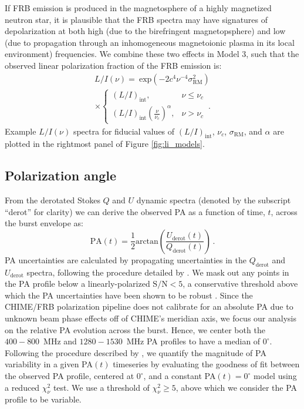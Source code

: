 \documentclass[twocolumn, linenumbers]{aastex701}
\begin{document}
If FRB emission is produced in the magnetosphere of a highly magnetized neutron star, it is plausible that the FRB spectra may have signatures of depolarization at both high (due to the birefringent magnetopsphere) and low (due to propagation through an inhomogeneous magnetoionic plasma in its local environment) frequencies. We combine these two effects in Model 3, such that the observed linear polarization fraction of the FRB emission is:
\begin{multline}
L/I (\nu) = ~\mathrm{exp} \left(-2 c^4 \nu^{-4} \sigma_\mathrm{RM}^2 \right)\\
\times
\begin{cases}
    (L/I)_\mathrm{int}, & \nu \leq \nu_c \\
    (L/I)_\mathrm{int} \left(\frac{\nu}{\nu_c}\right)^{\alpha}, & \nu > \nu_c 
\end{cases}
\,. \label{eq:model_3}
\end{multline}
Example $L/I (\nu)$ spectra for fiducial values of $(L/I)_\mathrm{int}$, $\nu_c$, $\sigma_\mathrm{RM}$, and $\alpha$ are plotted in the rightmost panel of Figure \ref{fig:li_models}.

\subsection{Polarization angle} \label{sec:models_pa}
From the derotated Stokes $Q$ and $U$ dynamic spectra (denoted by the subscript ``derot'' for clarity) we can derive the observed PA as a function of time, $t$, across the burst envelope as:
\begin{equation}
\mathrm{PA}(t) = \frac{1}{2} \mathrm{arctan} \left( \frac{U_\mathrm{derot}(t)}{Q_\mathrm{derot}(t)} \right)\,. \label{eq:pa}
\end{equation}
PA uncertainties are calculated by propagating uncertainties in the $Q_\mathrm{derot}$ and $U_\mathrm{derot}$ spectra, following the procedure detailed by \cite{2019ApJ...878...92V}. We mask out any points in the PA profile below a linearly-polarized $\mathrm{S/N} < 5$, a conservative threshold above which the PA uncertainties have been shown to be robust \citep[see Appendix B by][]{2024ApJ...968...50P}. Since the CHIME/FRB polarization pipeline does not calibrate for an absolute PA due to unknown beam phase effects off of CHIME's meridian axis, we focus our analysis on the relative PA evolution across the burst. Hence, we center both the $400-800$~MHz and $1280-1530$~MHz PA profiles to have a median of $0^\circ$. Following the procedure described by \cite{2024ApJ...968...50P}, we quantify the magnitude of PA variability in a given PA$(t)$ timeseries by evaluating the goodness of fit between the observed PA profile, centered at $0^\circ$, and a constant PA$(t) = 0^\circ$ model using a reduced $\chi_\nu^2$ test. We use a threshold of $\chi_\nu^2 \geq 5$, above which we consider the PA profile to be variable.
\end{document}
